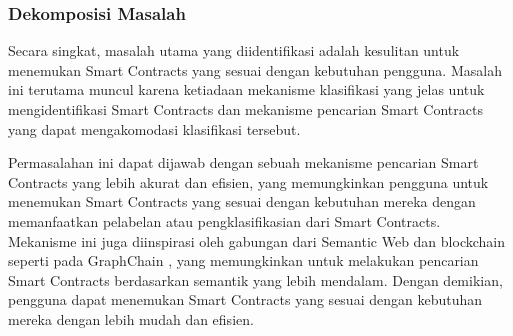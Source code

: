 \subsubsection{Dekomposisi Masalah}
\label{subsubsec:dekomposisi-masalah}


Secara singkat, masalah utama yang diidentifikasi adalah kesulitan untuk menemukan Smart Contracts yang sesuai dengan kebutuhan pengguna. Masalah ini terutama muncul karena ketiadaan mekanisme klasifikasi yang jelas untuk mengidentifikasi Smart Contracts dan mekanisme pencarian Smart Contracts yang dapat mengakomodasi klasifikasi tersebut.

Permasalahan ini dapat dijawab dengan sebuah mekanisme pencarian Smart Contracts yang lebih akurat dan efisien, yang memungkinkan pengguna untuk menemukan Smart Contracts yang sesuai dengan kebutuhan mereka dengan memanfaatkan pelabelan atau pengklasifikasian dari Smart Contracts. Mekanisme ini juga diinspirasi oleh gabungan dari Semantic Web dan blockchain seperti pada GraphChain \parencite{sopek2018graphchain}, yang memungkinkan untuk melakukan pencarian Smart Contracts berdasarkan semantik yang lebih mendalam. Dengan demikian, pengguna dapat menemukan Smart Contracts yang sesuai dengan kebutuhan mereka dengan lebih mudah dan efisien.

